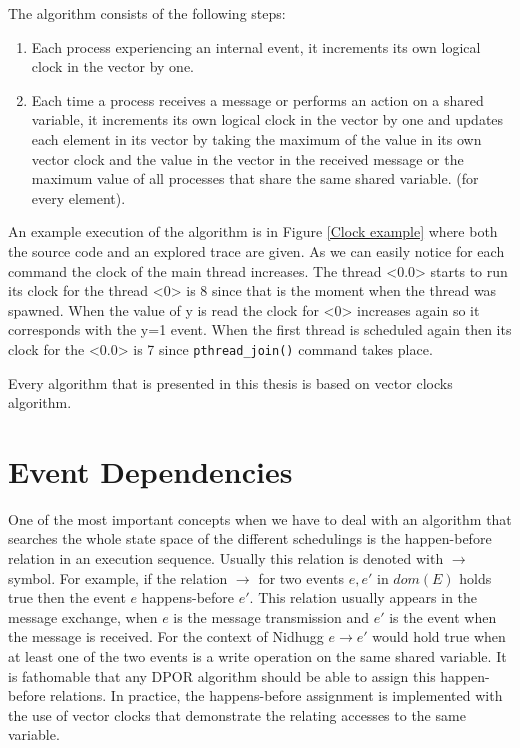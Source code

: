 The algorithm consists of the following steps:

\begin{enumerate}
    \item Each process experiencing an internal event, it increments its own logical clock in the vector by one.
    \item Each time a process receives a message or performs an action on a shared variable, it increments its own logical clock in the vector by one and updates each element in its vector 
    by taking the maximum of the value in its own vector clock and the value in the vector in the received message or the maximum value of all processes that share
    the same shared variable. (for every element).
\end{enumerate}

An example execution of the algorithm is in Figure \ref{Clock example} where both the source code and an explored trace are given.
As we can easily notice for each command the clock of the main thread increases. The thread <0.0> starts to run its clock for the thread <0> is 8 since 
that is the moment when the thread was spawned. When the value of y is read the clock for <0> increases again so it corresponds with the y=1 event. When the first thread is
scheduled again then its clock for the <0.0> is 7 since \verb|pthread_join()| command takes place.



Every algorithm that is presented in this thesis is based on vector clocks algorithm.

\section{Event Dependencies}

One of the most important concepts when we have to deal with an algorithm that searches the whole state space of the different schedulings is the 
happen-before relation in an execution sequence. Usually this relation is denoted with $\rightarrow$ symbol. For example, if the relation $\rightarrow$ 
for two events $e,e'$ in $dom(E)$ holds true then the event $e$ happens-before $e'$. This relation usually appears in the message exchange, when $e$ is the message
transmission and $e'$ is the event when the message is received. For the context of Nidhugg $e \rightarrow e'$ would hold true when at least one of the two events
is a write operation on the same shared variable. It is fathomable that any DPOR algorithm should be able to assign this happen-before relations. In practice,
the happens-before assignment is implemented with the use of vector clocks that demonstrate the relating accesses to the same variable.


